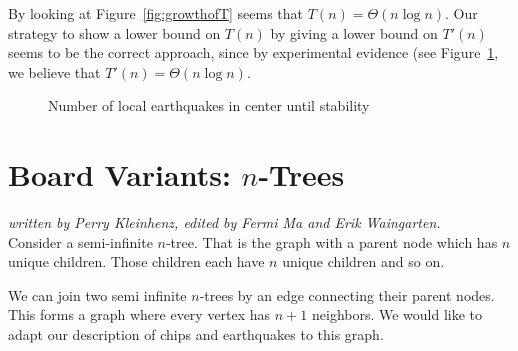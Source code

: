 \documentclass[runningheads,a4paper]{llncs}
\begin{document}
By looking at Figure~\ref{fig:growthofT} seems that $T(n) = \Theta(n\log n)$. Our strategy to show a lower bound on $T(n)$ by giving a lower bound on $T'(n)$ seems to be the correct approach, since by experimental evidence (see Figure~\ref{fig:growthofT'}, we believe that $T'(n) = \Theta(n\log n)$.

\begin{figure}[!ht]
\centering
{} \qquad
{}
\caption{Number of local earthquakes in center until stability}
\label{fig:growthofT'}
\end{figure}

\section{Board Variants: $n$-Trees}
\label{Board Variants: n-Trees}
\emph{written by Perry Kleinhenz, edited by Fermi Ma and Erik Waingarten.}\\

Consider a semi-infinite $n$-tree. That is the graph with a parent node which has $n$ unique children. Those children each have $n$ unique children and so on. 

We can join two semi infinite $n$-trees by an edge connecting their parent nodes. This forms a graph where every vertex has $n+1$ neighbors. We would like to adapt our description of chips and earthquakes to this graph. 
\end{document}

